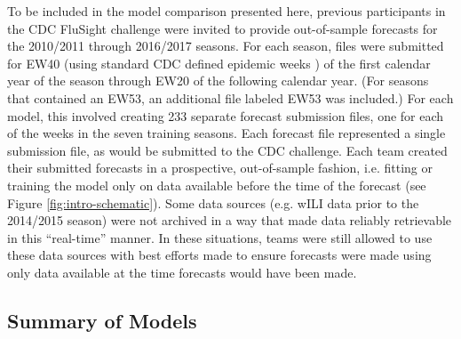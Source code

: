 \documentclass{article}
\begin{document}
To be included in the model comparison presented here, previous participants in the CDC FluSight challenge were invited to provide out-of-sample forecasts for the 2010/2011 through 2016/2017 seasons.
For each season, files were submitted for EW40 (using standard CDC defined epidemic weeks \cite{NewMexicoDepartmentofHealth,Niemi2015,Tushar2018}) of the first calendar year of the season through EW20 of the following calendar year. 
(For seasons that contained an EW53, an additional file labeled EW53 was included.)
For each model, this involved creating 233 separate forecast submission files, one for each of the weeks in the seven training seasons.
Each forecast file represented a single submission file, as would be submitted to the CDC challenge. 
Each team created their submitted forecasts in a prospective, out-of-sample fashion, i.e. fitting or training the model only on data available before the time of the forecast (see Figure \ref{fig:intro-schematic}). 
Some data sources (e.g. wILI data prior to the 2014/2015 season) were not archived in a way that made data reliably retrievable in this ``real-time'' manner. In these situations, teams were still allowed to use these data sources with best efforts made to ensure forecasts were made using only data available at the time forecasts would have been made.

\subsection{Summary of Models}
\end{document}
